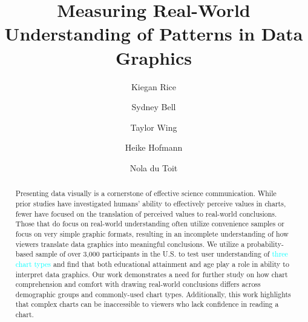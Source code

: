\documentclass{IEEEcsmag}
\begin{document}

\title{Measuring Real-World Understanding of Patterns in Data Graphics}

\author{Kiegan Rice}

\author{Sydney Bell}

\author{Taylor Wing}

\author{Heike Hofmann}

\author{Nola du Toit}


\begin{abstract}
Presenting data visually is a cornerstone of effective science communication. While prior studies have investigated humans' ability to effectively perceive values in charts, fewer have focused on the translation of perceived values to real-world conclusions. Those that do focus on real-world understanding often utilize convenience samples or focus on very simple graphic formats, resulting in an incomplete understanding of how viewers translate data graphics into meaningful conclusions. We utilize a probability-based sample of over 3,000 participants in the U.S. to test user understanding of \textcolor{cyan}{three chart types} and find that both educational attainment and age play a role in ability to interpret data graphics. Our work demonstrates a need for further study on how chart comprehension and comfort with drawing real-world conclusions differs across demographic groups and commonly-used chart types. Additionally, this work highlights that complex charts can be inaccessible to viewers who lack confidence in reading a chart.
\end{abstract}
\end{document}

